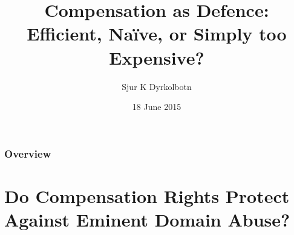 \documentclass{beamer}
\title[{\it Compensation as Defence}]{Compensation as Defence: Efficient, Na{\"  i}ve, or Simply too Expensive?} %
\author{Sjur K Dyrkolbotn} %
\institute[Durham University, Utrecht University] %
{
Durham University, Utrecht University \\ %
\medskip
\textit{s.k.dyrkolbotn@durham.ac.uk} %
}
\date{18 June 2015} %
\begin{document}
\begin{frame}
\titlepage %
\end{frame}

\begin{frame}
\frametitle{Overview} %
\tableofcontents %
\end{frame}


\section{Do Compensation Rights Protect Against Eminent Domain Abuse?} %

\end{document}
